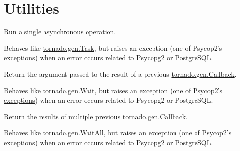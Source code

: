 \documentclass[letterpaper,10pt,english]{sphinxmanual}
\begin{document}
\section{Utilities}
\label{api:utilities}

\begin{fulllineitems}
\label{api:momoko.Op}
Run a single asynchronous operation.

Behaves like \href{http://www.tornadoweb.org/documentation/gen.html\#tornado.gen.Task}{tornado.gen.Task}, but raises an exception (one of Psycop2's
\href{http://initd.org/psycopg/docs/module.html\#exceptions}{exceptions}) when an error occurs related to Psycopg2 or PostgreSQL.

\end{fulllineitems}


\begin{fulllineitems}
\label{api:momoko.WaitOp}
Return the argument passed to the result of a previous \href{http://www.tornadoweb.org/documentation/gen.html\#tornado.gen.Callback}{tornado.gen.Callback}.

Behaves like \href{http://www.tornadoweb.org/documentation/gen.html\#tornado.gen.Wait}{tornado.gen.Wait}, but raises an exception (one of Psycop2's
\href{http://initd.org/psycopg/docs/module.html\#exceptions}{exceptions}) when an error occurs related to Psycopg2 or PostgreSQL.

\end{fulllineitems}


\begin{fulllineitems}
\label{api:momoko.WaitAllOps}
Return the results of multiple previous \href{http://www.tornadoweb.org/documentation/gen.html\#tornado.gen.Callback}{tornado.gen.Callback}.

Behaves like \href{http://www.tornadoweb.org/documentation/gen.html\#tornado.gen.WaitAll}{tornado.gen.WaitAll}, but raises an exception (one of Psycop2's
\href{http://initd.org/psycopg/docs/module.html\#exceptions}{exceptions}) when an error occurs related to Psycopg2 or PostgreSQL.

\end{fulllineitems}
\end{document}

